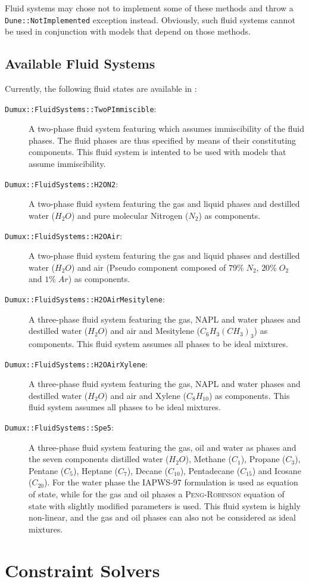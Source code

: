 Fluid systems may chose not to implement some of these methods and
throw a \texttt{Dune::NotImplemented} exception instead. Obviously,
such fluid systems cannot be used in conjunction with models that
depend on those methods.

\subsection{Available Fluid Systems}
Currently, the following fluid states are available in \Dumux:
\begin{description}
\item[\texttt{Dumux::FluidSystems::TwoPImmiscible}:] A two-phase fluid
  system featuring which assumes immiscibility of the fluid
  phases. The fluid phases are thus specified by means of their
  constituting components. This fluid system is intented to be used
  with models that assume immiscibility.
\item[\texttt{Dumux::FluidSystems::H2ON2}:] A two-phase fluid system
  featuring the gas and liquid phases and destilled water ($H_2O$) and
  pure molecular Nitrogen ($N_2$) as components.
\item[\texttt{Dumux::FluidSystems::H2OAir}:] A two-phase fluid system
  featuring the gas and liquid phases and destilled water ($H_2O$) and
  air (Pseudo component composed of $79\%\;N_2$, $20\%\;O_2$ and
  $1\%\;Ar$) as components.
\item[\texttt{Dumux::FluidSystems::H2OAirMesitylene}:] A three-phase fluid
  system featuring the gas, NAPL and water phases and destilled water
  ($H_2O$) and air and Mesitylene ($C_6H_3(CH_3)_3$) as components. This fluid
  system assumes all phases to be ideal mixtures.
\item[\texttt{Dumux::FluidSystems::H2OAirXylene}:] A three-phase fluid
  system featuring the gas, NAPL and water phases and destilled water
  ($H_2O$) and air and Xylene ($C_8H_{10}$) as components. This fluid
  system assumes all phases to be ideal mixtures.
\item[\texttt{Dumux::FluidSystems::Spe5}:] A three-phase fluid system
  featuring the gas, oil and water as phases and the seven components
  distilled water ($H_2O$), Methane ($C_1$), Propane ($C_3$), Pentane
  ($C_5$), Heptane ($C_7$), Decane ($C_{10}$), Pentadecane
  ($C_{15}$) and Icosane ($C_{20}$). For the water phase the IAPWS-97
  formulation is used as equation of state, while for the gas and oil
  phases a \textsc{Peng}-\textsc{Robinson} equation of state with
  slightly modified parameters is used. This fluid system is highly
  non-linear, and the gas and oil phases can also not be considered as
  ideal mixtures. %
\end{description}

\section{Constraint Solvers}
\label{sec:constraint_solvers}

